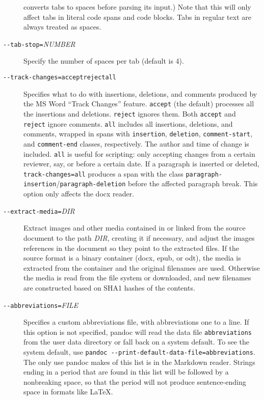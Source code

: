 \documentclass[]{article}
\begin{document}
\begin{description}
converts tabs to spaces before parsing its input.) Note that this will
only affect tabs in literal code spans and code blocks. Tabs in regular
text are always treated as spaces.
\item[\texttt{-\/-tab-stop=}\emph{NUMBER}]
Specify the number of spaces per tab (default is 4).
\item[\texttt{-\/-track-changes=accept}\textbar{}\texttt{reject}\textbar{}\texttt{all}]
Specifies what to do with insertions, deletions, and comments produced
by the MS Word ``Track Changes'' feature. \texttt{accept} (the default)
processes all the insertions and deletions. \texttt{reject} ignores
them. Both \texttt{accept} and \texttt{reject} ignore comments.
\texttt{all} includes all insertions, deletions, and comments, wrapped
in spans with \texttt{insertion}, \texttt{deletion},
\texttt{comment-start}, and \texttt{comment-end} classes, respectively.
The author and time of change is included. \texttt{all} is useful for
scripting: only accepting changes from a certain reviewer, say, or
before a certain date. If a paragraph is inserted or deleted,
\texttt{track-changes=all} produces a span with the class
\texttt{paragraph-insertion}/\texttt{paragraph-deletion} before the
affected paragraph break. This option only affects the docx reader.
\item[\texttt{-\/-extract-media=}\emph{DIR}]
Extract images and other media contained in or linked from the source
document to the path \emph{DIR}, creating it if necessary, and adjust
the images references in the document so they point to the extracted
files. If the source format is a binary container (docx, epub, or odt),
the media is extracted from the container and the original filenames are
used. Otherwise the media is read from the file system or downloaded,
and new filenames are constructed based on SHA1 hashes of the contents.
\item[\texttt{-\/-abbreviations=}\emph{FILE}]
Specifies a custom abbreviations file, with abbreviations one to a line.
If this option is not specified, pandoc will read the data file
\texttt{abbreviations} from the user data directory or fall back on a
system default. To see the system default, use
\texttt{pandoc\ -\/-print-default-data-file=abbreviations}. The only use
pandoc makes of this list is in the Markdown reader. Strings ending in a
period that are found in this list will be followed by a nonbreaking
space, so that the period will not produce sentence-ending space in
formats like LaTeX.
\end{description}
\end{document}

